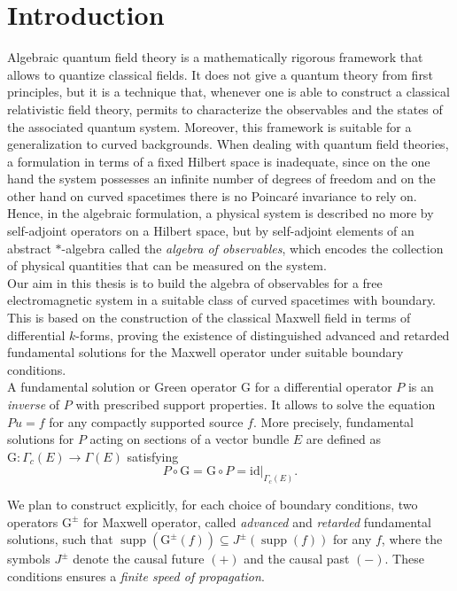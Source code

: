 \chapter*{Introduction}

Algebraic quantum field theory is a mathematically rigorous framework that allows to quantize classical fields. It does not give a quantum theory from first principles, but it is a technique that, whenever one is able to construct a classical relativistic field theory, permits to characterize the observables and the states of the associated quantum system. Moreover, this framework is suitable for a generalization to curved backgrounds.
When dealing with quantum field theories, a formulation in terms of a fixed Hilbert space is inadequate, since on the one hand the system possesses an infinite number of degrees of freedom and on the other hand on curved spacetimes there is no Poincar\'e invariance to rely on. Hence, in the algebraic formulation, a physical system is described no more by self-adjoint operators on a Hilbert space, but by self-adjoint elements of an abstract $*$-algebra called the \emph{algebra of observables}, which encodes the collection of physical quantities that can be measured on the system.\\

Our aim in this thesis is to build the algebra of observables for a free electromagnetic system in a suitable class of curved spacetimes with boundary. This is based on the construction of the classical Maxwell field in terms of differential $k$-forms, proving the existence of distinguished advanced and retarded fundamental solutions for the Maxwell operator under suitable boundary conditions.\\

A fundamental solution or Green operator $\mathrm{G}$ for a differential operator $P$ is an \emph{inverse} of $P$ with prescribed support properties. It allows to solve the equation $Pu=f$ for any compactly supported source $f$. More precisely, fundamental solutions for $P$ acting on sections of a vector bundle $E$ are defined as $\mathrm{G} : \Gamma_c(E) \rightarrow \Gamma(E)$ satisfying
\begin{equation*}
P \circ \mathrm{G}=\mathrm{G} \circ P=\left.\mathrm{id}\right|_{\Gamma_c(E)}.
\end{equation*}

We plan to construct explicitly, for each choice of boundary conditions, two operators $\mathrm{G}^{\pm}$ for Maxwell operator, called \emph{advanced} and \emph{retarded} fundamental solutions, such that $\operatorname{supp}\left(\mathrm{G}^{\pm}(f)\right) \subseteq J^{\pm}(\operatorname{supp}(f))$ for any $f$, where the symbols $J^\pm$ denote the causal future $(+)$ and the causal past $(-)$. These conditions ensures a \emph{finite speed of propagation}.

